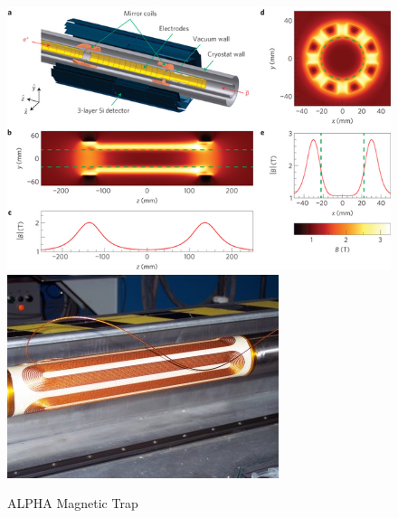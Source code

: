 \documentclass{article}
\begin{document}
\begin{figure}[h]
\centering
\includegraphics[scale=0.4]{magnets-trap}
\includegraphics[scale=0.52]{magnet}
\caption{ALPHA Magnetic Trap}
\end{figure}
\end{document}
